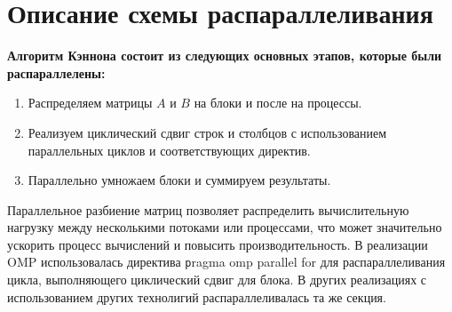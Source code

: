 \documentclass{report}
\begin{document}
\section* {Описание схемы распараллеливания}
\par \textbf{Алгоритм Кэннона состоит из следующих основных этапов, которые были распараллелены:}
\begin{enumerate}
\item Распределяем матрицы $A$ и $B$ на блоки и после на процессы. 
\item Реализуем циклический сдвиг строк и столбцов с использованием параллельных циклов и соответствующих директив.
\item Параллельно умножаем блоки и суммируем результаты.
\end{enumerate}

\par Параллельное разбиение матриц позволяет распределить вычислительную нагрузку между несколькими потоками или процессами, что может значительно ускорить процесс вычислений и повысить производительность. В реализации OMP использовалась директива \texttt pragma omp parallel for для распараллеливания цикла, выполняющего циклический сдвиг для блока. В других реализациях с использованием других технолигий распараллеливалась та же секция.

\newpage

\end{document}
